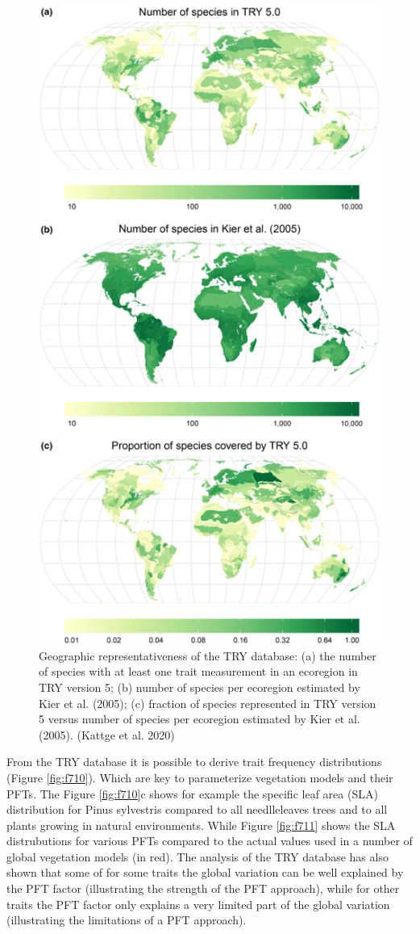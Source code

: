 \documentclass[12pt,oneside]{book}
\begin{document}
\begin{figure}

{\centering \includegraphics[width=0.6\linewidth]{figures/chap7/f79_try_kier} 

}

\caption{Geographic representativeness of the TRY database: (a) the number of species with at least one trait measurement in an ecoregion in TRY version 5; (b) number of species per ecoregion estimated by Kier et al. (2005); (c) fraction of species represented in TRY version 5 versus number of species per ecoregion estimated by Kier et al. (2005). (Kattge et al. 2020)}\label{fig:f79}
\end{figure}

From the TRY database it is possible to derive trait frequency
distributions (Figure \ref{fig:f710}). Which are key to parameterize
vegetation models and their PFTs. The Figure \ref{fig:f710}c shows for
example the specific leaf area (SLA) distribution for Pinus sylvestris
compared to all needlleleaves trees and to all plants growing in natural
environments. While Figure \ref{fig:f711} shows the SLA distrubutions
for various PFTs compared to the actual values used in a number of
global vegetation models (in red). The analysis of the TRY database has
also shown that some of for some traits the global variation can be well
explained by the PFT factor (illustrating the strength of the PFT
approach), while for other traits the PFT factor only explains a very
limited part of the global variation (illustrating the limitations of a
PFT approach).
\end{document}
